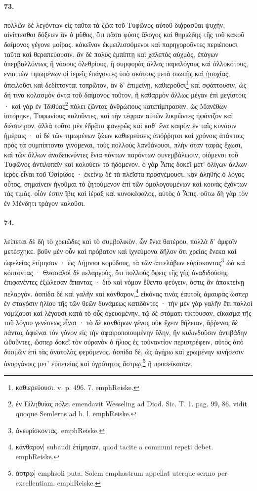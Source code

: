 \documentclass[a4paper, 11pt, oneside, polutonikogreek, german]{article}
\begin{document}
\paragraph{73.}
πολλῶν δὲ λεγόντων εἰς ταῦτα τὰ ζῶα τοῦ Τυφῶνος αὐτοῦ διᾴρασθαι ψυχὴν, αἰνίττεσθαι δόξειεν ἂν ὁ μῦθος, ὅτι πᾶσα φύσις ἄλογος καὶ θηριώδης τῆς τοῦ κακοῦ δαίμονος γέγονε μοίρας. κἀκεῖνον ἐκμειλισσόμενοι καὶ παρηγοροῦντες περιέπουσι ταῦτα καὶ θεραπεύουσιν. ἂν δὲ πολὺς ἐμπίπτῃ καὶ χαλεπὸς αὐχμὸς, ἐπάγων ὑπερβαλλόντως ἢ νόσους ὀλεθρίους, ἢ συμφορὰς ἄλλας παραλόγους καὶ ἀλλοκότους, ενια τῶν τιμωμένων οἱ ἱερεῖς ἐπάγοντες ὑπὸ σκότους μετὰ σιωπῆς καὶ ἡσυχίας, ἀπειλοῦσι καὶ δεδίττονται τοπρῶτον, ἂν δ' ἐπιμείνῃ, καθιεροῦσι\footnote{καθιερεύουσι. v. p. 496. 7. emph{Reiske.}} καὶ σφάττουσιν, ὡς δή τινα κολασμὸν ὄντα τοῦ δαίμονος τοῦτον, ἢ καθαρμὸν ἄλλως μέγαν ἐπὶ μεγίστοις · καὶ γὰρ ἐν Ἰδιθύας\footnote{ἐν Εἰληθυίας πόλει emendavit Wesseling ad Diod. Sic. T. 1. pag. 99, 86. vidit quoque Semlerus ad h. l. emph{Reiske.}} πόλει ζῶντας ἀνθρώπους κατεπίμπρασαν, ὡς Μανέθων ἱστόρηκε, Τυφωνίους καλοῦντες, καὶ τὴν τέφραν αὐτῶν λικμῶντες ἠφάνιζον καὶ διέσπειρον. ἀλλὰ τοῦτο μὲν ἐδρᾶτο φανερῶς καὶ καθ' ἕνα καιρὸν ἐν ταῖς κυνάσιν ἡμέραις · αἱ δὲ τῶν τιμωμένων ζώων καθιερεύσεις ἀπόῤῥητοι καὶ χρόνοις ἀτάκτοις πρὸς τὰ συμπίπτοντα γινόμεναι, τοὺς πολλοὺς λανθάνουσι, πλὴν ὅταν ταφὰς ἔχωσι, καὶ τῶν ἄλλων ἀναδεικνύντες ἔνια πάντων παρόντων συνεμβάλωσιν, οἰόμενοι τοῦ Τυφῶνος ἀντιλυπεῖν καὶ κολούειν τὸ ἡδόμενον. ὁ γὰρ Ἆπις δοκεῖ μετ' ὀλίγων ἄλλων ἱερὸς εἶναι τοῦ Ὀσίριδος · ἐκείνῳ δὲ τὰ πλεῖστα προσνέμουσι. κᾂν ἀληθὴς ὁ λόγος οὗτος, σημαίνειν ἡγοῦμαι τὸ ζητούμενον ἐπὶ τῶν ὁμολογουμένων καὶ κοινὰς ἐχόντων τὰς τιμάς. οἷόν ἐστιν ἴβις καὶ ἱέραξ καὶ κυνοκέφαλος, αὐτὸς ὁ Ἆπις. οὕτω δὴ γὰρ τὸν ἐν Μένδητι τράγον καλοῦσι.

\paragraph{74.}
λείπεται δὲ δὴ τὸ χρειῶδες καὶ τὸ συμβολικὸν, ὧν ἔνια θατέρου, πολλὰ δ' ἀμφοῖν μετέσχηκε. βοῦν μὲν οὖν καὶ πρόβατον καὶ ἰχνεύμονα δῆλον ὅτι χρείας ἕνεκα καὶ ὠφελείας ἐτίμησαν · ὡς Λήμνιοι κορύδους, τὰ τῶν ἀττελάβων εὑρίσκοντας\footnote{ἀνευρίσκοντας. emph{Reiske.}} ὠὰ καὶ κόπτοντας · Θεσσαλοὶ δὲ πελαργοὺς, ὅτι πολλοὺς ὄφεις τῆς γῆς ἀναδιδούσης ἐπιφανέντες ἐξώλεσαν ἅπαντας · διὸ καὶ νόμον ἔθεντο φεύγειν, ὅστις ἂν ἀποκτείνῃ πελαργόν. ἀσπίδα δὲ καὶ γαλῆν καὶ κάνθαρον,\footnote{κάνθαρον] subaudi ἐτίμησαν, quod tacite a communi repeti debet. emph{Reiske.}} εἰκόνας τινὰς ἑαυτοῖς ἀμαυρὰς ὥσπερ ἐν σταγόσιν ἡλίου τῆς τῶν θεῶν δυνάμεως κατιδόντες · τὴν μὲν γὰρ γαλῆν ἔτι πολλοὶ νομίζουσι καὶ λέγουσι κατὰ τὸ οὖς ὀχευομένην, τῷ δὲ στόματι τίκτουσαν, εἴκασμα τῆς τοῦ λόγου γενέσεως εἶναι · τὸ δὲ κανθάρων γένος οὐκ ἔχειν θήλειαν, ἄῤῥενας δὲ πάντας ἀφιέναι τὸν γόνον εἰς τὴν σφαιροποιουμένην ὕλην, ἣν κυλινδοῦσιν ἀντιβάδην ὠθοῦντες, ὥσπερ δοκεῖ τὸν οὐρανὸν ὁ ἥλιος ἐς τοὐναντίον περιστρέφειν, αὐτὸς ἀπὸ δυσμῶν ἐπὶ τὰς ἀνατολὰς φερόμενος. ἀσπίδα δὲ, ὡς ἀγήρω καὶ χρωμένην κινήσεσιν ἀνοργάνοις μετ' εὐπετείας καὶ ὑγρότητος ἄστρῳ,\footnote{ἄστρῳ] emph{soli} puta. Solem emph{astrum} appellat uterque sermo per excellentiam. emph{Reiske.}} ἢ προσείκασαν.
\end{document}
